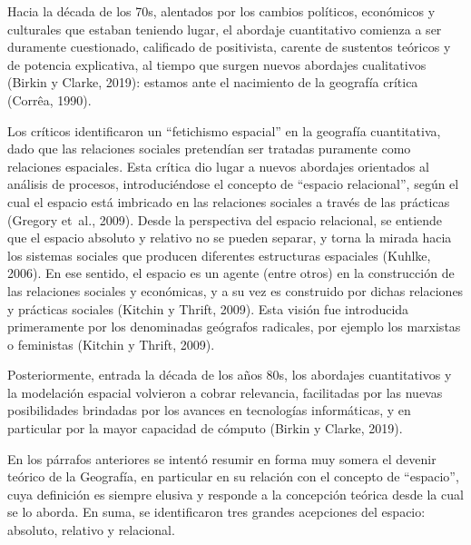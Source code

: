 \documentclass[12pt,spanish,]{article}
\begin{document}
Hacia la década de los 70s, alentados por los cambios políticos,
económicos y culturales que estaban teniendo lugar, el abordaje
cuantitativo comienza a ser duramente cuestionado, calificado de
positivista, carente de sustentos teóricos y de potencia explicativa, al
tiempo que surgen nuevos abordajes cualitativos (Birkin y Clarke, 2019):
estamos ante el nacimiento de la geografía crítica (Corrêa, 1990).

Los críticos identificaron un ``fetichismo espacial'' en la geografía
cuantitativa, dado que las relaciones sociales pretendían ser tratadas
puramente como relaciones espaciales. Esta crítica dio lugar a nuevos
abordajes orientados al análisis de procesos, introduciéndose el
concepto de ``espacio relacional'', según el cual el espacio está
imbricado en las relaciones sociales a través de las prácticas (Gregory
et~al., 2009). Desde la perspectiva del espacio relacional, se entiende
que el espacio absoluto y relativo no se pueden separar, y torna la
mirada hacia los sistemas sociales que producen diferentes estructuras
espaciales (Kuhlke, 2006). En ese sentido, el espacio es un agente
(entre otros) en la construcción de las relaciones sociales y
económicas, y a su vez es construido por dichas relaciones y prácticas
sociales (Kitchin y Thrift, 2009). Esta visión fue introducida
primeramente por los denominadas geógrafos radicales, por ejemplo los
marxistas o feministas (Kitchin y Thrift, 2009).

Posteriormente, entrada la década de los años 80s, los abordajes
cuantitativos y la modelación espacial volvieron a cobrar relevancia,
facilitadas por las nuevas posibilidades brindadas por los avances en
tecnologías informáticas, y en particular por la mayor capacidad de
cómputo (Birkin y Clarke, 2019).

En los párrafos anteriores se intentó resumir en forma muy somera el
devenir teórico de la Geografía, en particular en su relación con el
concepto de ``espacio'', cuya definición es siempre elusiva y responde a
la concepción teórica desde la cual se lo aborda. En suma, se
identificaron tres grandes acepciones del espacio: absoluto, relativo y
relacional.
\end{document}
